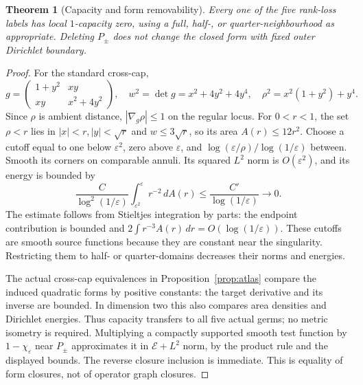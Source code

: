 \documentclass[11pt]{article}
\theoremstyle{readable}
\newtheorem{theorem}{Theorem}[section]
\theoremstyle{remark}\newtheorem{remark}[theorem]{Remark}
\newcommand{\dd}{\,d}\newcommand{\norm}[1]{\left\lVert#1\right\rVert}
\begin{document}
\begin{theorem}[Capacity and form removability]\label{thm:capacity}
Every one of the five rank-loss labels has local $1$-capacity zero, using
a full, half-, or quarter-neighbourhood as appropriate. Deleting $P_\pm$
does not change the closed form with fixed outer Dirichlet boundary.
\end{theorem}
\begin{proof}
For the standard cross-cap,
\[
 g=\begin{pmatrix}1+y^2&xy\\xy&x^2+4y^2\end{pmatrix},\quad
 w^2=\det g=x^2+4y^2+4y^4,\quad
 \rho^2=x^2(1+y^2)+y^4.
\]
Since $\rho$ is ambient distance, $|\nabla_g\rho|\leq1$ on the regular
locus. For $0<r<1$, the set $\rho<r$ lies in
$|x|<r,|y|<\sqrt r$ and $w\leq3\sqrt r$, so its area $A(r)\leq12r^2$.
Choose a cutoff equal to one below $\varepsilon^2$, zero above
$\varepsilon$, and $\log(\varepsilon/\rho)/\log(1/\varepsilon)$ between.
Smooth its corners on comparable annuli. Its squared $L^2$ norm is
$O(\varepsilon^2)$, and its energy is bounded by
\[
 \frac{C}{\log^2(1/\varepsilon)}
 \int_{\varepsilon^2}^{\varepsilon}r^{-2}\dd A(r)
 \leq\frac{C'}{\log(1/\varepsilon)}\longrightarrow0.
\]
The estimate follows from Stieltjes integration by parts:
the endpoint contribution is bounded and
$2\int r^{-3}A(r)\dd r=O(\log(1/\varepsilon))$.
These cutoffs are smooth source functions because they are constant near
the singularity. Restricting them to half- or quarter-domains decreases
their norms and energies.

The actual cross-cap equivalences in Proposition~\ref{prop:atlas} compare
the induced quadratic forms by positive constants: the target derivative
and its inverse are bounded. In dimension two this also compares area
densities and Dirichlet energies. Thus capacity transfers to all five actual
germs; no metric isometry is required. Multiplying a compactly supported
smooth test function by $1-\chi_\varepsilon$ near $P_\pm$ approximates it
in $\mathcal E+L^2$ norm, by the product rule and the displayed bounds.
The reverse closure inclusion is immediate. This is equality of form
closures, not of operator graph closures.
\end{proof}
\end{document}
